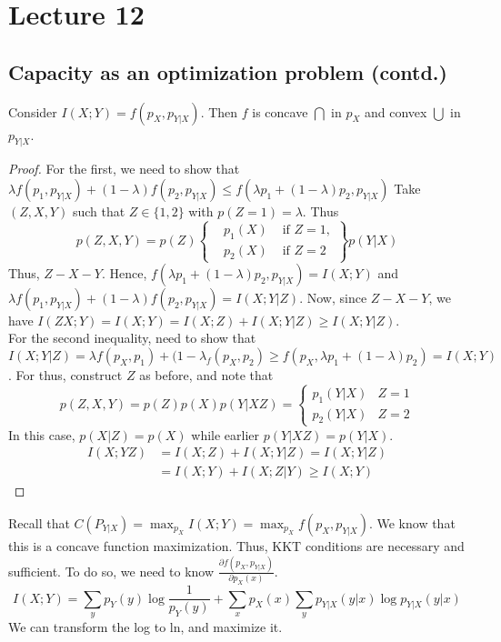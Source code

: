 \chapter{Lecture 12}
\section{Capacity as an optimization problem (contd.)}
\begin{theorem}
Consider $I(X;Y) = f(p_X, p_{Y|X})$. Then $f$ is concave $\bigcap$ in $p_X$ and convex $\bigcup$ in $p_{Y|X}$.
\end{theorem}
\begin{proof}
For the first, we need to show that $\lambda f(p_1, p_{Y|X}) + (1-\lambda)f(p_2, p_{Y|X}) \leq f(\lambda p_1 + (1-\lambda)p_2, p_{Y|X})$
Take $(Z, X, Y)$ such that $Z \in \{1,2\}$ with $p(Z=1) = \lambda$. Thus 
\[p(Z,X,Y) = p(Z) \left\{\!\begin{aligned}
&p_1(X) &\text{ if } Z=1,\\[1ex]
&p_2(X)&\text{ if } Z=2
\end{aligned}\right\} p(Y|X)\]
Thus, $Z - X - Y$. Hence, $f(\lambda p_1 + (1-\lambda)p_2, p_{Y|X}) = I(X;Y)$ and $\lambda f(p_1, p_{Y|X}) + (1-\lambda) f(p_2, p_{Y|X}) = I(X;Y|Z)$. Now, since $Z-X-Y$, we have $I(ZX;Y) = I(X;Y) = I(X;Z) + I(X;Y|Z) \geq I(X;Y|Z)$. \\
For the second inequality, need to show that $I(X;Y|Z) = \lambda f(p_X, p_1) + (1-\lambda_f(p_X, p_2) \geq f(p_X, \lambda p_1 + (1-\lambda)p_2) = I(X;Y)$. For thus, construct $Z$ as before, and note that
\[p(Z,X,Y) = p(Z)p(X)p(Y|XZ) = \begin{cases}
p_1(Y|X) & Z = 1 \\
p_2(Y|X) & Z = 2
\end{cases}\]
In this case, $p(X|Z) = p(X)$ while earlier $p(Y|XZ) = p(Y|X)$.
\begin{align*}
    I(X;YZ) &=I(X;Z) + I(X;Y|Z) = I(X;Y|Z) \\
    &= I(X;Y) + I(X;Z|Y) \geq I(X;Y)
\end{align*}
\end{proof}
Recall that $C(P_{Y|X}) = \max_{p_X} I(X;Y) = \max_{p_X} f(p_X, p_{Y|X})$. We know that this is a concave function maximization. Thus, KKT conditions are necessary and sufficient. To do so, we need to know $\frac{\partial f(p_X, p_{Y|X})}{\partial p_X(x)}$. \\
\[I(X;Y) = \sum_y p_Y(y) \log\frac{1}{p_Y(y)} + \sum_xp_X(x) \sum_y p_{Y|X}(y|x)\log p_{Y|X}(y|x)\]
We can transform the log to ln, and maximize it.

